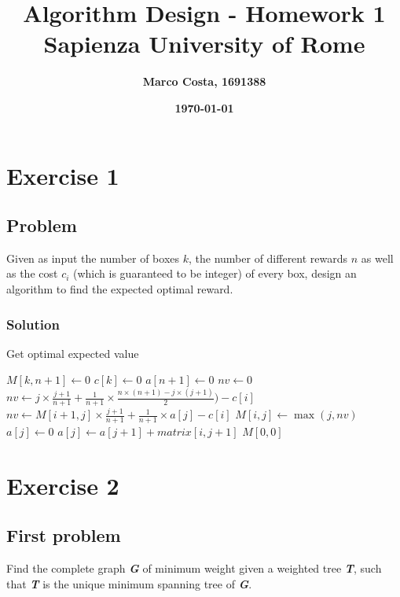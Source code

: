 \documentclass[11pt]{article}
\title{\textbf{Algorithm Design - Homework 1} \\ \bigskip \large \textbf{Sapienza University of Rome}}
\date{\textbf{\today}}
\author{\textbf{Marco Costa, 1691388}}
\begin{document}
\maketitle
\newpage

\section*{Exercise 1}
\subsection*{Problem}
Given as input the number of boxes $k$, the number of different rewards $n$ as well as
the cost $c_i$ (which is guaranteed to be integer) of every box, design an algorithm to find the expected optimal reward.
\subsubsection*{Solution}
\begin{algorithm}
	\caption{Get optimal expected value}\label{euclid}
	\begin{algorithmic}[1]
		\State $M[k, n+1] \gets 0$
		\State $c[k] \gets 0$
		\State $a[n+1] \gets 0$
		\State $nv \gets 0$
			\State $nv \gets j \times \frac{j+1}{n+1} + \frac{1}{n+1} \times \frac{n \times (n+1)-j \times (j+1)}{2}) - c[i]$
		\Else
			\State $nv \gets M[i+1, j] \times \frac{j+1}{n+1} + \frac{1}{n+1} \times a[j] - c[i]$
		\EndIf
		\State $M[i, j] \gets \max(j, nv)$
			\State $a[j] \gets 0$
		\Else
			\State $a[j] \gets a[j+1] + matrix[i, j+1]$
		\EndIf
		\EndFor		
		\EndFor
		\State \Return $M[0, 0]$
	\end{algorithmic}
\end{algorithm}
\newpage

\section*{Exercise 2}
\subsection*{First problem}
Find the complete graph \textbf{\textit{G}} of minimum weight given a weighted tree \textbf{\textit{T}}, such that  \textbf{\textit{T}} is the unique minimum spanning tree of \textbf{\textit{G}}.
\end{document}
